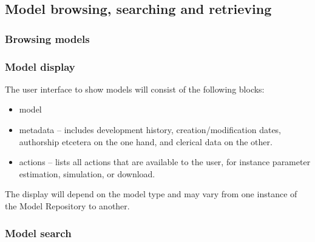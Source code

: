 

\subsection{Model browsing, searching and retrieving}

\subsubsection{Browsing models}

\subsubsection{Model display}

The user interface to show models will consist of the following blocks:
\begin{itemize}
\item model
\item metadata -- includes development history, creation/modification dates, authorship etcetera on the one hand, and clerical data on the other.
\item actions -- lists all actions that are available to the user, for instance parameter estimation, simulation, or download.
\end{itemize}

The display will depend on the model type and may vary from one instance of the Model Repository to another.

\subsubsection{Model search}

